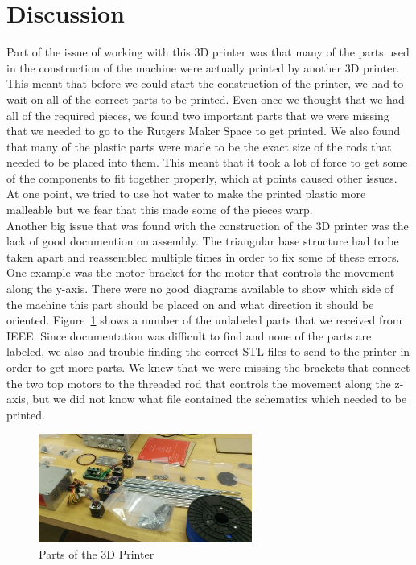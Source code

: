 \documentclass[12pt,twocolumn]{article}
\begin{document}
\section{Discussion}
Part of the issue of working with this 3D printer was that many of the parts used in the construction of the machine were actually printed by another 3D printer. This meant that before we could start the construction of the printer, we had to wait on all of the correct parts to be printed. Even once we thought that we had all of the required pieces, we found two important parts that we were missing that we needed to go to the Rutgers Maker Space to get printed. We also found that many of the plastic parts were made to be the exact size of the rods that needed to be placed into them. This meant that it took a lot of force to get some of the components to fit together properly, which at points caused other issues. At one point, we tried to use hot water to make the printed plastic more malleable but we fear that this made some of the pieces warp. \\
\indent Another big issue that was found with the construction of the 3D printer was the lack of good documention on assembly. The triangular base structure had to be taken apart and reassembled multiple times in order to fix some of these errors. One example was the motor bracket for the motor that controls the movement along the y-axis. There were no good diagrams available to show which side of the machine this part should be placed on and what direction it should be oriented. Figure~\ref{parts} shows a number of the unlabeled parts that we received from IEEE. Since documentation was difficult to find and none of the parts are labeled, we also had trouble finding the correct STL files to send to the printer in order to get more parts. We knew that we were missing the brackets that connect the two top motors to the threaded rod that controls the movement along the z-axis, but we did not know what file contained the schematics which needed to be printed.\\
\begin{figure}[H]
\centering
\includegraphics[width=70mm]{WP_20130223_002.jpg}
\caption{Parts of the 3D Printer}
\label{parts}
\end{figure}
\end{document}
